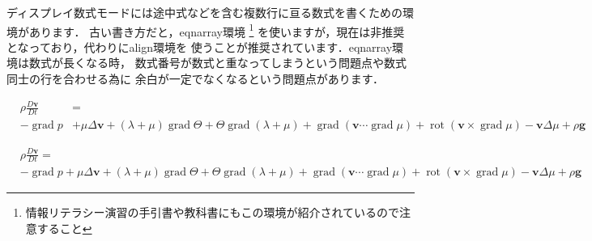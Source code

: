 \documentclass[dvipdfmx,uplatex]{jsarticle}
\DeclareMathOperator{\grad}{\mathrm{grad}}
\DeclareMathOperator{\rot}{\mathrm{rot}}
\begin{document}
{\begin{tcolorbox}[title=複数行に亘る数式環境]
  ディスプレイ数式モードには途中式などを含む複数行に亘る数式を書くための環境があります．
  古い書き方だと，eqnarray環境
  \footnote{情報リテラシー演習の手引書や教科書にもこの環境が紹介されているので注意すること}
  を使いますが，現在は非推奨となっており，代わりにalign環境を
  使うことが推奨されています．eqnarray環境は数式が長くなる時，
  数式番号が数式と重なってしまうという問題点や数式同士の行を合わせる為に
  余白が一定でなくなるという問題点があります．
  \begin{tcolorbox}[title=eqnarray環境, colframe=wrongcolor]
    \small
    \begin{eqnarray}
      &\rho\frac{D\bm{v}}{Dt}& =  \\
      &-\grad p& + \mu\Delta \bm{v} + (\lambda + \mu)\grad\Theta +
      \Theta\grad(\lambda + \mu) + \grad(\bm{v} \cdots \grad\mu) +
      \rot(\bm{v} \times \grad\mu) - \bm{v}\Delta\mu + \rho\bm{g}
    \end{eqnarray}
  \end{tcolorbox}
  \begin{tcolorbox}[title=align環境, colframe=correctcolor]
    \small
    \begin{align}
      &\rho\frac{D\bm{v}}{Dt} = \\
      &-\grad p + \mu\Delta \bm{v} + (\lambda + \mu)\grad\Theta +
      \Theta\grad(\lambda + \mu) + \grad(\bm{v} \cdots \grad\mu) +
      \rot(\bm{v} \times \grad\mu) - \bm{v}\Delta\mu + \rho\bm{g}
    \end{align}
  \end{tcolorbox}
\end{tcolorbox}
}
\end{document}

